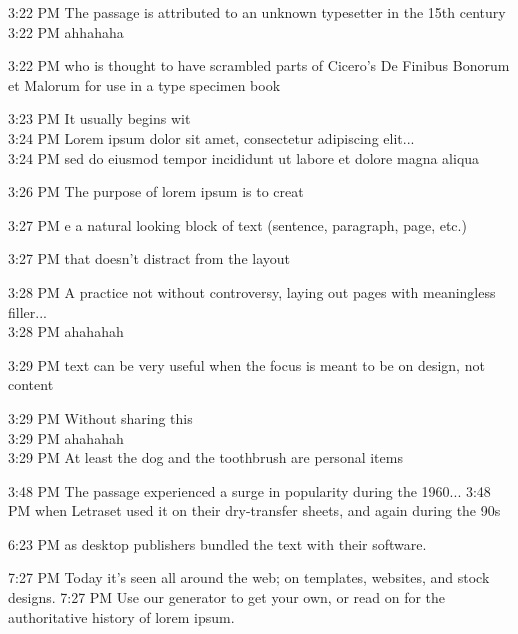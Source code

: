 \documentclass{article}
\begin{document}
\begin{chat}
3:22 PM The passage is attributed to an unknown typesetter in the 15th century\\
3:22 PM ahhahaha

3:22 PM who is thought to have scrambled parts of Cicero's De Finibus Bonorum et Malorum for use in a type specimen book

3:23 PM It usually begins wit\\
3:24 PM Lorem ipsum dolor sit amet, consectetur adipiscing elit...\\
3:24 PM sed do eiusmod tempor incididunt ut labore et dolore magna aliqua

3:26 PM The purpose of lorem ipsum is to creat

3:27 PM e a natural looking block of text (sentence, paragraph, page, etc.)

3:27 PM that doesn't distract from the layout

3:28 PM A practice not without controversy, laying out pages with meaningless filler...\\
3:28 PM ahahahah

3:29 PM text can be very useful when the focus is meant to be on design, not content

3:29 PM Without sharing this \\
3:29 PM ahahahah\\
3:29 PM At least the dog and the toothbrush are personal items

3:48 PM The passage experienced a surge in popularity during the 1960...
3:48 PM when Letraset used it on their dry-transfer sheets, and again during the 90s

6:23 PM as desktop publishers bundled the text with their software.

7:27 PM Today it's seen all around the web; on templates, websites, and stock designs.
7:27 PM Use our generator to get your own, or read on for the authoritative history of lorem ipsum. 

\end{chat}
\end{document}
